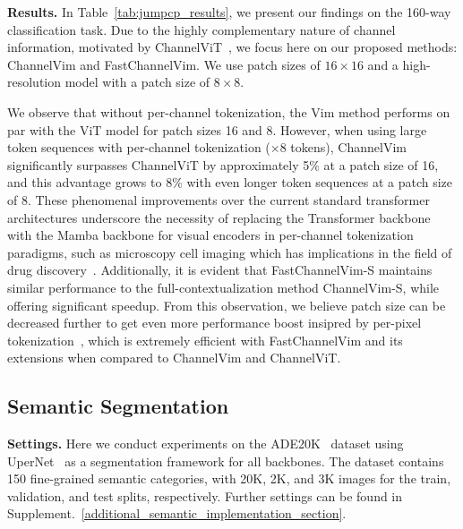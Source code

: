 \noindent \textbf{Results.} In Table~\ref{tab:jumpcp_results}, we present our findings on the 160-way classification task. 
Due to the highly complementary nature of channel information, motivated by ChannelViT~\cite{channelvit}, we focus here on our proposed methods: ChannelVim and FastChannelVim. We use patch sizes of $16 \times 16$ and a high-resolution model with a patch size of $8 \times 8$. 

We observe that without per-channel tokenization, the Vim method performs on par with the ViT model for patch sizes 16 and 8. However, when using large token sequences with per-channel tokenization ($\times 8$ tokens), ChannelVim significantly surpasses ChannelViT by approximately 5\% at a patch size of 16, and this advantage grows to 8\% with even longer token sequences at a patch size of 8. 
These phenomenal improvements over the current standard transformer architectures underscore the necessity of replacing the Transformer backbone with the Mamba backbone for visual encoders in per-channel tokenization paradigms, such as microscopy cell imaging which has implications in the field of drug discovery~\cite{kenyon2024vitally, pham2024enhancing}. Additionally, it is evident that FastChannelVim-S maintains similar performance to the full-contextualization method ChannelVim-S, while offering significant speedup. From this observation, we believe patch size can be decreased further to get even more performance boost insipred by per-pixel tokenization~\cite{nguyen2024image}, which is extremely efficient with FastChannelVim and its extensions when compared to ChannelVim and ChannelViT. 


\subsection{Semantic Segmentation}
\label{subexp:segmentation}

\noindent \textbf{Settings.} Here we conduct experiments on the ADE20K~\cite{ade20k} dataset using UperNet~\cite{upernet} as a segmentation framework for all backbones. The dataset contains 150 fine-grained semantic categories, with 20K, 2K, and 3K images for the train, validation, and test splits, respectively. Further settings can be found in Supplement.~\ref{additional_semantic_implementation_section}.

